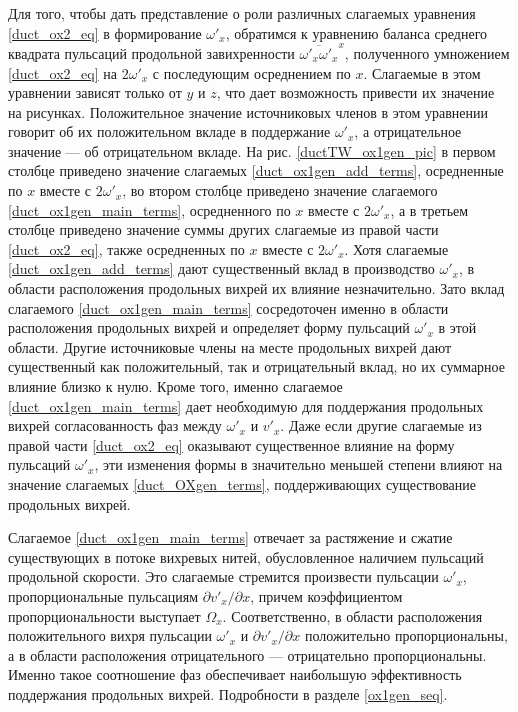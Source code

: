 Для того, чтобы дать представление о роли различных слагаемых уравнения \eqref{duct_ox2_eq} в формирование $\omega'_x$, обратимся к уравнению баланса среднего квадрата пульсаций продольной завихренности $\overline{\omega'_x \omega'_x}^x$, полученного умножением \eqref{duct_ox2_eq} на $2\omega'_x$ с последующим осреднением по $x$. Слагаемые в этом уравнении зависят только от $y$ и $z$, что дает возможность привести их значение на рисунках. Положительное значение источниковых членов в этом уравнении говорит об их положительном вкладе в поддержание $\omega'_x$, а отрицательное значение --- об отрицательном вкладе. На рис. \ref{ductTW_ox1gen_pic} в первом столбце приведено значение слагаемых \eqref{duct_ox1gen_add_terms}, осредненные по $x$ вместе с $2\omega'_x$, во втором столбце приведено значение слагаемого \eqref{duct_ox1gen_main_terms}, осредненного по $x$ вместе с $2\omega'_x$, а в третьем столбце приведено значение суммы других слагаемые из правой части \eqref{duct_ox2_eq}, также осредненных по $x$ вместе с $2\omega'_x$. Хотя слагаемые \eqref{duct_ox1gen_add_terms} дают существенный вклад в производство $\omega'_x$, в области расположения продольных вихрей их влияние незначительно. Зато вклад слагаемого \eqref{duct_ox1gen_main_terms} сосредоточен именно в области расположения продольных вихрей и определяет форму пульсаций $\omega'_x$ в этой области. Другие источниковые члены на месте продольных вихрей дают существенный как положительный, так и отрицательный вклад, но их суммарное влияние близко к нулю. Кроме того, именно слагаемое \eqref{duct_ox1gen_main_terms} дает необходимую для поддержания продольных вихрей согласованность фаз между $\omega'_x$ и $v'_x$. Даже если другие слагаемые из правой части \eqref{duct_ox2_eq} оказывают существенное влияние на форму пульсаций $\omega'_x$, эти изменения формы в значительно меньшей степени влияют на значение слагаемых \eqref{duct_OXgen_terms}, поддерживающих существование продольных вихрей.

Слагаемое \eqref{duct_ox1gen_main_terms} отвечает за растяжение и сжатие существующих в потоке вихревых нитей, обусловленное наличием пульсаций продольной скорости. Это слагаемые стремится произвести пульсации $\omega'_x$, пропорциональные пульсациям $\partial v'_x / \partial x$, причем коэффициентом пропорциональности выступает $\Omega_x$. Соответственно, в области расположения положительного вихря пульсации $\omega'_x$ и $\partial v'_x / \partial x$ положительно пропорциональны, а в области расположения отрицательного --- отрицательно пропорциональны. Именно такое соотношение фаз обеспечивает наибольшую эффективность поддержания продольных вихрей. Подробности в разделе \ref{ox1gen_seq}. 

